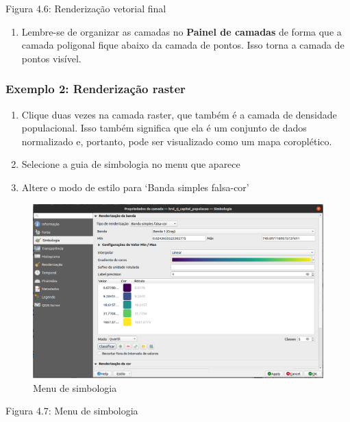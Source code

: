 \documentclass[
]{book}
\providecommand{\tightlist}{%
  \setlength{\itemsep}{0pt}\setlength{\parskip}{0pt}}
\begin{document}
Figura 4.6: Renderização vetorial final

\begin{enumerate}
\def\labelenumi{\arabic{enumi}.}
\setcounter{enumi}{10}
\tightlist
\item
  Lembre-se de organizar as camadas no \textbf{Painel de camadas} de forma que a camada poligonal fique abaixo da camada de pontos. Isso torna a camada de pontos visível.
\end{enumerate}

\hypertarget{exemplo-2-renderizauxe7uxe3o-raster}{%
\subsubsection{\texorpdfstring{\textbf{Exemplo 2: Renderização raster}}{Exemplo 2: Renderização raster}}\label{exemplo-2-renderizauxe7uxe3o-raster}}

\begin{enumerate}
\def\labelenumi{\arabic{enumi}.}
\tightlist
\item
  Clique duas vezes na camada raster, que também é a camada de densidade populacional. Isso também significa que ela é um conjunto de dados normalizado e, portanto, pode ser visualizado como um mapa coroplético.
\item
  Selecione a guia de simbologia no menu que aparece
\item
  Altere o modo de estilo para `Banda simples falsa-cor'
\end{enumerate}

\begin{figure}
\centering
\includegraphics{media/modulo4/qgis9.png}
\caption{Menu de simbologia}
\end{figure}

Figura 4.7: Menu de simbologia
\end{document}
